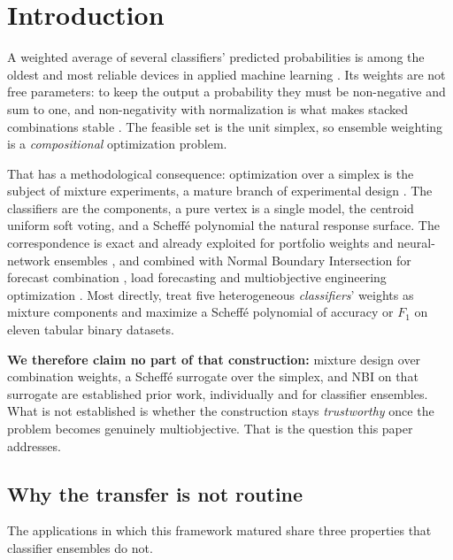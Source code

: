 \section{Introduction}
\label{sec:intro}

A weighted average of several classifiers' predicted probabilities is among the oldest and most reliable devices in
applied machine learning \citep{hansen1990neural,wolpert1992stacked,kittler1998combining,caruana2004ensemble}. Its
weights are not free parameters: to keep the output a probability they must be non-negative and sum to one, and
non-negativity with normalization is what makes stacked combinations stable \citep{breiman1996stacked}. The feasible
set is the unit simplex, so ensemble weighting is a \emph{compositional} optimization problem.

That has a methodological consequence: optimization over a simplex is the subject of mixture experiments, a mature
branch of experimental design \citep{scheffe1958mixtures,scheffe1963simplexcentroid,cornell2002mixtures}. The
classifiers are the components, a pure vertex is a single model, the centroid uniform soft voting, and a Scheffé
polynomial the natural response surface. The correspondence is exact and already exploited for portfolio weights
\citep{mendes2016portfolio_mde,leal2022portfolio_doptimal_mde} and neural-network ensembles
\citep{moreira2021ann_ensemble_mde}, and combined with Normal Boundary Intersection for forecast combination
\citep{bacci2019nbi_mixture}, load forecasting \citep{rocha2025ensemblestlf} and multiobjective engineering
optimization \citep{pereira2025hybrid}. Most directly, \citet{kwon2024ensemble} treat five heterogeneous
\emph{classifiers}' weights as mixture components and maximize a Scheffé polynomial of accuracy or $F_1$ on eleven
tabular binary datasets.

\textbf{We therefore claim no part of that construction:} mixture design over combination weights, a Scheffé surrogate
over the simplex, and NBI on that surrogate are established prior work, individually and for classifier ensembles.
What is not established is whether the construction stays \emph{trustworthy} once the problem becomes genuinely
multiobjective. That is the question this paper addresses.

\subsection{Why the transfer is not routine}

The applications in which this framework matured share three properties that classifier ensembles do not.

